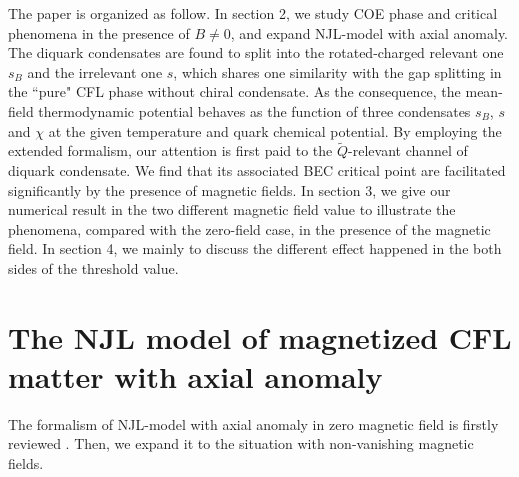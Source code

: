 \documentclass[prd, showpacs,nofootinbib,amsmath,amssymb,12pt]{revtex4}
\begin{document}
The paper is organized as follow.
In section 2, we study COE phase and critical phenomena in the presence of $B\neq0$, and expand NJL-model with axial anomaly.
The diquark condensates are found to split into the rotated-charged relevant one $s_B$ and the irrelevant one $s$,
which shares one similarity with the gap splitting in the ``pure" CFL phase without chiral condensate.
As the consequence, the mean-field thermodynamic potential behaves as the function of three condensates $s_B$,
$s$ and $\chi$ at the given temperature and quark chemical potential.
By employing the extended formalism, our attention is first paid to the ${\widetilde{Q}}$-relevant channel of diquark condensate.
We find that its associated BEC critical point are facilitated significantly by the presence of magnetic fields.
In section 3, we give our numerical result in the two different magnetic field value to illustrate the phenomena,
compared with the zero-field case, in the presence of the magnetic field.
In section 4, we mainly to discuss the different effect happened in the both sides of the threshold value.

\section{The NJL model of magnetized CFL matter with axial anomaly}

The formalism of NJL-model with axial anomaly in zero magnetic field is firstly reviewed \cite{abuki2010nambu}.
Then, we expand it to the situation with  non-vanishing magnetic fields.
\end{document}
